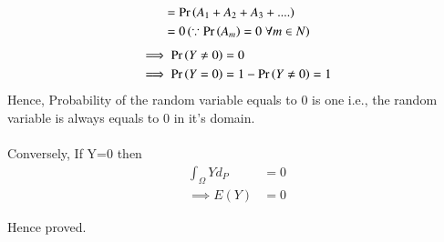 \documentclass[journal,12pt,twocolumn]{IEEEtran}
\begin{document}
\begin{align}
    &= \Pr\left(A_1 + A_2 + A_3 + ....\right)\\
    &= 0\,(\because \Pr\left(A_m\right) = 0\;\forall m \in N)
\end{align}
\begin{align}
  \implies \Pr\left(Y \neq 0\right) &= 0\\
  \implies \Pr\left(Y =0\right) &= 1- \Pr\left(Y \neq 0\right) = 1
\end{align}
Hence, Probability of the random variable equals to 0 is one i.e., the random variable is always equals to 0 in it's domain.\\\\
Conversely, If Y=0 then
\begin{align}
    \int_\Omega Yd_P &=0\\ 
    \implies E(Y) &=0 
\end{align}

Hence proved.
\end{document}
